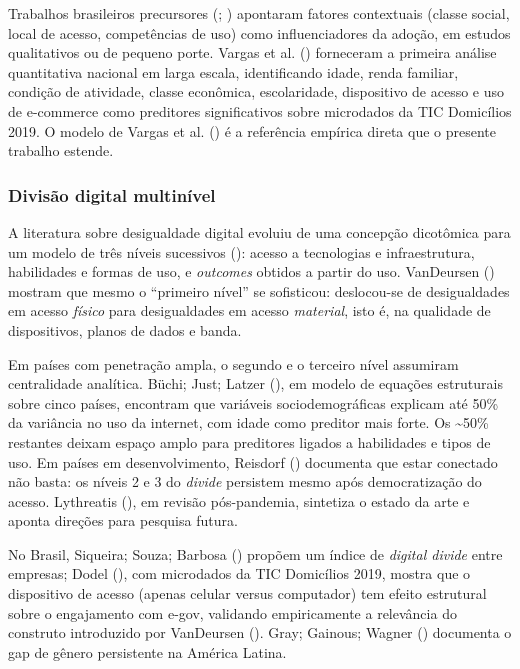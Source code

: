 \documentclass[
  man,
  floatsintext,
  longtable,
  a4paper,
  nolmodern,
  notxfonts,
  notimes,
  colorlinks=true,linkcolor=blue,citecolor=blue,urlcolor=blue]{apa7}
\begin{document}
Trabalhos brasileiros precursores
(;
) apontaram
fatores contextuais (classe social, local de acesso, competências de
uso) como influenciadores da adoção, em estudos qualitativos ou de
pequeno porte. Vargas et al. ()
forneceram a primeira análise quantitativa nacional em larga escala,
identificando idade, renda familiar, condição de atividade, classe
econômica, escolaridade, dispositivo de acesso e uso de e-commerce como
preditores significativos sobre microdados da TIC Domicílios 2019. O
modelo de Vargas et al. () é a referência
empírica direta que o presente trabalho estende.

\subsubsection{Divisão digital
multinível}\label{divisuxe3o-digital-multinuxedvel}

A literatura sobre desigualdade digital evoluiu de uma concepção
dicotômica para um modelo de três níveis sucessivos
(): acesso a tecnologias e
infraestrutura, habilidades e formas de uso, e \emph{outcomes} obtidos a
partir do uso. VanDeursen ()
mostram que mesmo o ``primeiro nível'' se sofisticou: deslocou-se de
desigualdades em acesso \emph{físico} para desigualdades em acesso
\emph{material}, isto é, na qualidade de dispositivos, planos de dados e
banda.

Em países com penetração ampla, o segundo e o terceiro nível assumiram
centralidade analítica. Büchi; Just; Latzer
(), em modelo de equações
estruturais sobre cinco países, encontram que variáveis
sociodemográficas explicam até 50\% da variância no uso da internet, com
idade como preditor mais forte. Os \textasciitilde50\% restantes deixam
espaço amplo para preditores ligados a habilidades e tipos de uso. Em
países em desenvolvimento, Reisdorf
() documenta que estar
conectado não basta: os níveis 2 e 3 do \emph{divide} persistem mesmo
após democratização do acesso. Lythreatis
(), em revisão pós-pandemia,
sintetiza o estado da arte e aponta direções para pesquisa futura.

No Brasil, Siqueira; Souza; Barbosa
() propõem um índice de
\emph{digital divide} entre empresas; Dodel
(), com microdados da TIC
Domicílios 2019, mostra que o dispositivo de acesso (apenas celular
versus computador) tem efeito estrutural sobre o engajamento com e-gov,
validando empiricamente a relevância do construto introduzido por
VanDeursen (). Gray; Gainous;
Wagner () documenta o gap de
gênero persistente na América Latina.
\end{document}
